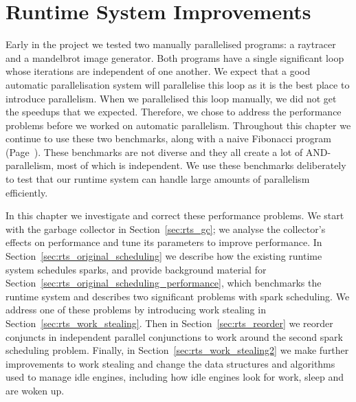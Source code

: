 
\chapter{Runtime System Improvements}
\label{chap:rts}


Early in the project
we tested two manually parallelised programs:
a raytracer and a mandelbrot image generator.
Both programs have a single significant loop
whose iterations are independent of one another.
We expect that a good automatic parallelisation system will parallelise this
loop as it is the best place to introduce parallelism.
When we parallelised this loop manually,
we did not get the speedups that we expected.
Therefore,
we chose to address the performance problems
before we worked on automatic parallelism.
Throughout this chapter
we continue to use these two benchmarks, along with a naive Fibonacci
program (Page~\pageref{page:fibs}).
These benchmarks are not diverse and they all create a lot of
AND-parallelism,
most of which is independent.
We use these benchmarks deliberately to test that our runtime system can
handle large amounts of parallelism efficiently.

In this chapter we investigate and correct these performance problems.
We start with the garbage collector in Section~\ref{sec:rts_gc};
we analyse the collector's effects on performance and tune its parameters
to improve performance.
In Section~\ref{sec:rts_original_scheduling} we describe how the existing runtime
system schedules sparks,
and provide background material for
Section~\ref{sec:rts_original_scheduling_performance},
which benchmarks the runtime system and describes two significant problems with
spark scheduling.
We address one of these problems by introducing work stealing in
Section~\ref{sec:rts_work_stealing}.
Then in Section~\ref{sec:rts_reorder} we reorder conjuncts in independent
parallel conjunctions to work around the second spark scheduling problem.
Finally, in Section~\ref{sec:rts_work_stealing2} we make further
improvements to
work stealing and change the data structures and algorithms used to manage
idle engines,
including how idle engines look for work, sleep and are woken up.






%


%

